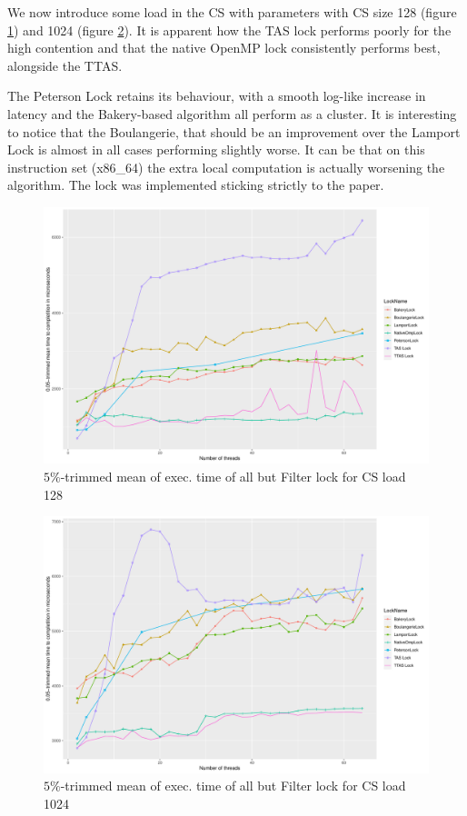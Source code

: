 We now introduce some load in the CS with parameters with CS size 128 (figure
\ref{fig:meantime-128-no-filter}) and 1024 (figure \ref{fig:meantime-1024-no-filter}).
It is apparent how the TAS lock performs poorly for the high contention
and that the native OpenMP lock consistently performs best, alongside the TTAS.

The Peterson Lock retains its behaviour, with a smooth log-like increase in latency
and the Bakery-based algorithm all perform as a cluster.
It is interesting to notice that the Boulangerie, that should be an improvement
over the Lamport Lock is almost in all cases performing slightly worse.
It can be that on this instruction set (x86\_64) the extra local computation is
actually worsening the algorithm.
The lock was implemented sticking strictly to the paper.

\begin{figure}[H]
  \includegraphics[width=\textwidth]{fig/meantime_128_no_filter}
  \caption{$5\%$-trimmed mean of exec. time of all but Filter lock for CS load 128}
  \label{fig:meantime-128-no-filter}
\end{figure}

\begin{figure}[H]
  \includegraphics[width=\textwidth]{fig/meantime_1024_no_filter}
  \caption{$5\%$-trimmed mean of exec. time of all but Filter lock for CS load 1024}
  \label{fig:meantime-1024-no-filter}
\end{figure}

